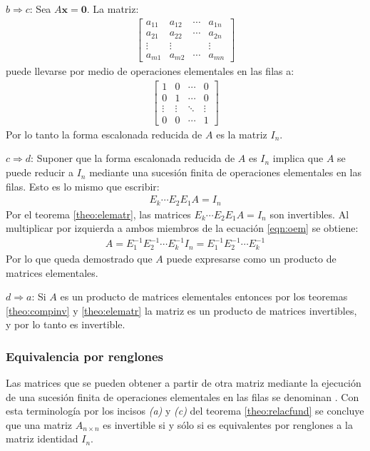 \documentclass[a4paper,12pt]{article}
\begin{document}
$b\Rightarrow c$: Sea $A\mathbf{x}=\textbf{0}$. La matriz:
\begin{align*}
  \begin{bmatrix}
    a_{11}& a_{12}& \cdots& a_{1n} \\
    a_{21}& a_{22}& \cdots& a_{2n} \\
    \vdots&\vdots &       &\vdots  \\
    a_{m1}& a_{m2}& \cdots& a_{mn} 
  \end{bmatrix}
\end{align*}
puede llevarse por medio de operaciones elementales en las filas a:
\begin{align*}
  \begin{bmatrix}
    1&   0& \cdots& 0 \\
    0&   1& \cdots& 0 \\
    \vdots&\vdots & \ddots  &\vdots  \\
    0&   0& \cdots& 1 
  \end{bmatrix}
\end{align*}
Por lo tanto la forma escalonada reducida de $A$ es la matriz $I_n$.

$c\Rightarrow d$: Suponer que la forma escalonada reducida de $A$ es
$I_n$ implica que $A$ se puede reducir a $I_n$ mediante una sucesión finita de
operaciones elementales en las filas. Esto es lo mismo que escribir:
\begin{align}
  E_k\cdots E_2E_1A=I_n
  \label{eqn:oem}
\end{align}
Por el teorema \ref{theo:elematr}, las matrices $E_k\cdots E_2E_1A=I_n$ son
invertibles. Al multiplicar por izquierda a ambos miembros de la ecuación
\eqref{eqn:oem} se obtiene:
\begin{align*}
  A=E_1^{-1}E_2^{-1}\cdots E_k^{-1}I_n=E_1^{-1}E_2^{-1}\cdots E_k^{-1}
\end{align*}
Por lo que queda demostrado que $A$ puede expresarse como un producto de
matrices elementales.

$d\Rightarrow a$: Si $A$ es un producto de matrices elementales entonces por
los teoremas \ref{theo:compinv} y \ref{theo:elematr} la matriz es un producto
de matrices invertibles, y por lo tanto es invertible.

\subsubsection{Equivalencia por renglones}
Las matrices que se pueden obtener a partir de otra matriz mediante la
ejecución de una sucesión finita de operaciones elementales en las filas se
denominan . Con esta terminología por los
incisos \emph{(a)} y \emph{(c)} del teorema \ref{theo:relacfund} se concluye
que una matriz $A_{n\times n}$ es invertible si y sólo si es equivalentes por
renglones a la matriz identidad $I_{n}$.
\end{document}
